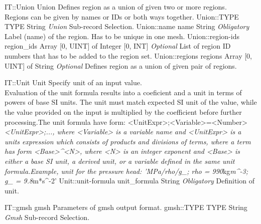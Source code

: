 \begin{RecordType}
	{IT::Union}
	{Union}
	{} %
	{} %
	{{{Defines region as a union of given two or more regions.}\\{
Regions can be given by names or IDs or both ways together.}}}
		\RecKey
			{Union::TYPE}
			{TYPE}
			{{String}}
			{ \it{Union} }
			{{{Sub-record Selection.}}}
		\RecKey
			{Union::name}
			{name}
			{{String}}
			{ \it{Obligatory} }
			{{{Label (name) of the region. Has to be unique in one mesh.}}}
		\RecKey
			{Union::region-ids}
			{region{\_}ids}
			{{Array [0, UINT] of }{Integer [0, INT]}}
			{ \it{Optional} }
			{{{List of region ID numbers that has to be added to the region set.}}}
		\RecKey
			{Union::regions}
			{regions}
			{{Array [0, UINT] of }{String}}
			{ \it{Optional} }
			{{{Defines region as a union of given pair of regions.}}}
\end{RecordType}
\begin{RecordType}
	{IT::Unit}
	{Unit}
	{} %
	{} %
	{{{Specify unit of an input value. }\\{
Evaluation of the unit formula results into a coeficient and a unit in terms of powers of base SI units. The unit must match expected SI unit of the value, while the value provided on the input is multiplied by the coefficient before further processing.The unit formula have form: {\textless}UnitExpr{\textgreater};{\textless}Variable{\textgreater}={\textless}Number{\textgreater}}\textit{{\textless}UnitExpr{\textgreater};..., where {\textless}Variable{\textgreater} is a variable name and {\textless}UnitExpr{\textgreater} is a units expression which consists of products and divisions of terms, where a term has form {\textless}Base{\textgreater}{\^{}}{\textless}N{\textgreater}, where {\textless}N{\textgreater} is an integer exponent and {\textless}Base{\textgreater} is either a base SI unit, a derived unit, or a variable defined in the same unit formula.Example, unit for the pressure head: 'MPa/rho/g{\_}; rho = 990}{kg}\textit{m{\^{}}-3; g{\_} = 9.8}{m*s{\^{}}-2'}}}
		\RecKey
			{Unit::unit-formula}
			{unit{\_}formula}
			{{String}}
			{ \it{Obligatory} }
			{{{Definition of unit.}}}
\end{RecordType}
\begin{RecordType}
	{IT::gmsh}
	{gmsh}
	{} %
	{} %
	{{{Parameters of gmsh output format.}}}
		\RecKey
			{gmsh::TYPE}
			{TYPE}
			{{String}}
			{ \it{Gmsh} }
			{{{Sub-record Selection.}}}
\end{RecordType}
